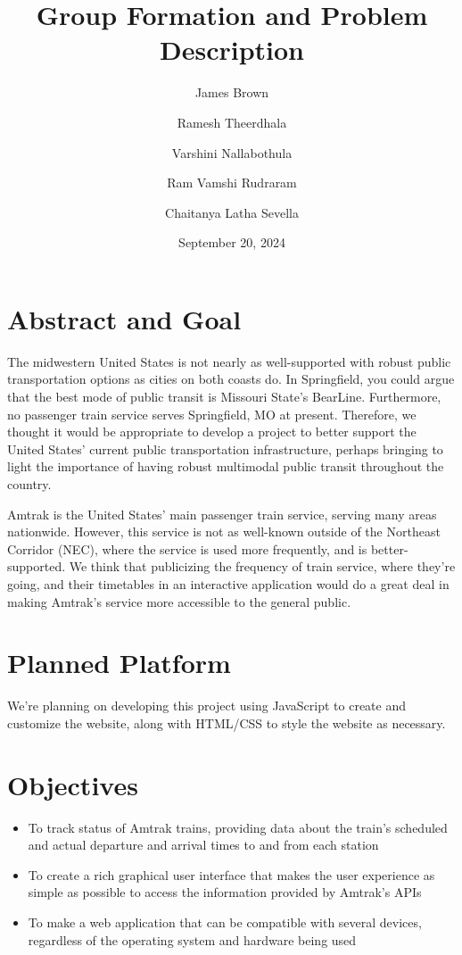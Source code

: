 \documentclass[letterpaper, 11pt, DIV = 10]{scrartcl}
\title{Group Formation and Problem Description}
\author{James Brown\and Ramesh Theerdhala\and Varshini Nallabothula\and Ram Vamshi Rudraram\and Chaitanya Latha Sevella}
\date{September 20, 2024}
\begin{document}
	\begin{titlepage}
		\maketitle
	\end{titlepage}
	
	\section*{Abstract and Goal}
		The midwestern United States is not nearly as well-supported with robust public transportation options as cities on both coasts do. In Springfield, you could argue that the best mode of public transit is Missouri State's BearLine. Furthermore, no passenger train service serves Springfield, MO at present. Therefore, we thought it would be appropriate to develop a project to better support the United States' current public transportation infrastructure, perhaps bringing to light the importance of having robust multimodal public transit throughout the country.
		
		Amtrak is the United States' main passenger train service, serving many areas nationwide. However, this service is not as well-known outside of the Northeast Corridor (NEC), where the service is used more frequently, and is better-supported. We think that publicizing the frequency of train service, where they're going, and their timetables in an interactive application would do a great deal in making Amtrak's service more accessible to the general public. %
		
	\section*{Planned Platform}
		We're planning on developing this project using JavaScript to create and customize the website, along with HTML/CSS to style the website as necessary.
		
	\section*{Objectives}
		\begin{itemize}
			\item To track status of Amtrak trains, providing data about the train's scheduled and actual departure and arrival times to and from each station
			\item To create a rich graphical user interface that makes the user experience as simple as possible to access the information provided by Amtrak's APIs
			\item To make a web application that can be compatible with several devices, regardless of the operating system and hardware being used 
		\end{itemize}
		
		
\end{document}
